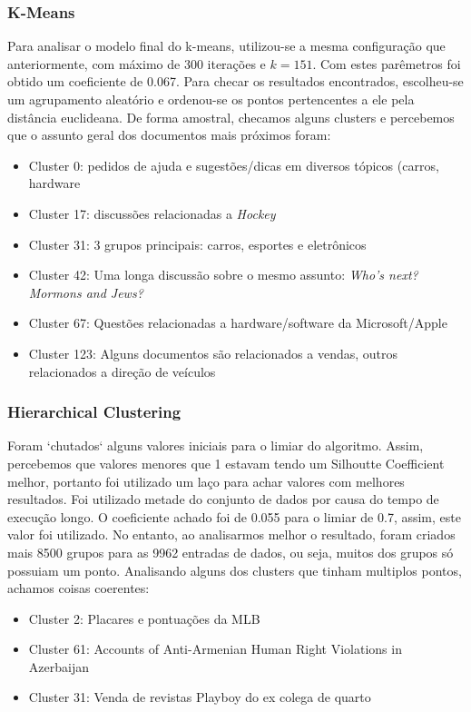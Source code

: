 \documentclass[conference]{IEEEtran}
\begin{document}
\subsubsection{K-Means}
Para analisar o modelo final do k-means, utilizou-se a mesma configuração que anteriormente, com máximo de 300 iterações e $k=151$. Com estes parêmetros foi obtido um coeficiente de 0.067. Para checar os resultados encontrados, escolheu-se um agrupamento aleatório e ordenou-se os pontos pertencentes a ele pela distância euclideana. De forma amostral, checamos alguns clusters e percebemos que o assunto geral dos documentos mais próximos foram:

\begin{itemize}
\item Cluster 0: pedidos de ajuda e sugestões/dicas em diversos tópicos (carros, hardware
\item Cluster 17: discussões relacionadas a \textit{Hockey}
\item Cluster 31: 3 grupos principais: carros, esportes e eletrônicos
\item Cluster 42: Uma longa discussão sobre o mesmo assunto: \textit{Who's next? Mormons and Jews?}
\item Cluster 67: Questões relacionadas a hardware/software da Microsoft/Apple
\item Cluster 123: Alguns documentos são relacionados a vendas, outros relacionados a direção de veículos
\end{itemize}

\subsubsection{Hierarchical Clustering}
Foram `chutados`  alguns valores iniciais para o limiar do algoritmo. Assim, percebemos que valores menores que 1 estavam tendo um Silhoutte Coefficient melhor, portanto foi utilizado um laço para achar valores com melhores resultados. Foi utilizado metade do conjunto de dados por causa do tempo de execução longo. O coeficiente achado foi de 0.055 para o limiar de 0.7, assim, este valor foi utilizado.
No entanto, ao analisarmos melhor o resultado, foram criados mais 8500 grupos para as 9962 entradas de dados, ou seja, muitos dos grupos só possuiam um ponto. Analisando alguns dos clusters que tinham multiplos pontos, achamos coisas coerentes:

\begin{itemize}
\item Cluster 2: Placares e pontuações da MLB
\item Cluster 61: Accounts of Anti-Armenian Human Right Violations in Azerbaijan
\item Cluster 31: Venda de revistas Playboy do ex colega de quarto
\end{itemize}
\end{document}
